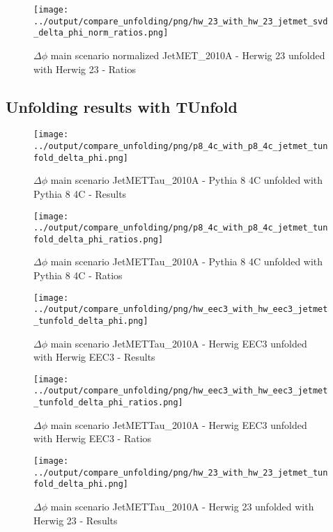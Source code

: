 \documentclass[11pt]{book}
\begin{document}
\begin{figure}[ht]
\centering
\texttt{[image: ../output/compare\_unfolding/png/hw\_23\_with\_hw\_23\_jetmet\_svd\_delta\_phi\_norm\_ratios.png]}
\caption{$\Delta\phi$ main scenario normalized JetMET\_2010A - Herwig 23 unfolded with Herwig 23 - Ratios}
\label{hw_23_jetmet_svd_delta_phi_norm_b}
\end{figure}


\clearpage
\subsection{Unfolding results with TUnfold}

\begin{figure}[ht]
\centering
\texttt{[image: ../output/compare\_unfolding/png/p8\_4c\_with\_p8\_4c\_jetmet\_tunfold\_delta\_phi.png]}
\caption{$\Delta\phi$ main scenario JetMETTau\_2010A - Pythia 8 4C unfolded with Pythia 8 4C - Results}
\label{p8_p8_jetmet_tunfold_delta_phi_a}
\end{figure}

\begin{figure}[ht]
\centering
\texttt{[image: ../output/compare\_unfolding/png/p8\_4c\_with\_p8\_4c\_jetmet\_tunfold\_delta\_phi\_ratios.png]}
\caption{$\Delta\phi$ main scenario JetMETTau\_2010A - Pythia 8 4C unfolded with Pythia 8 4C - Ratios}
\label{p8_p8_jetmet_tunfold_delta_phi_b}
\end{figure}

\begin{figure}[ht]
\centering
\texttt{[image: ../output/compare\_unfolding/png/hw\_eec3\_with\_hw\_eec3\_jetmet\_tunfold\_delta\_phi.png]}
\caption{$\Delta\phi$ main scenario JetMETTau\_2010A - Herwig EEC3 unfolded with Herwig EEC3 - Results}
\label{hw_eec3_hw_eec3_jetmet_tunfold_delta_phi_a}
\end{figure}

\begin{figure}[ht]
\centering
\texttt{[image: ../output/compare\_unfolding/png/hw\_eec3\_with\_hw\_eec3\_jetmet\_tunfold\_delta\_phi\_ratios.png]}
\caption{$\Delta\phi$ main scenario JetMETTau\_2010A - Herwig EEC3 unfolded with Herwig EEC3 - Ratios}
\label{hw_eec3_jetmet_tunfold_delta_phi_b}
\end{figure}

\begin{figure}[ht]
\centering
\texttt{[image: ../output/compare\_unfolding/png/hw\_23\_with\_hw\_23\_jetmet\_tunfold\_delta\_phi.png]}
\caption{$\Delta\phi$ main scenario JetMETTau\_2010A - Herwig 23 unfolded with Herwig 23 - Results}
\label{hw_23_hw_23_jetmet_tunfold_delta_phi_a}
\end{figure}
\end{document}
